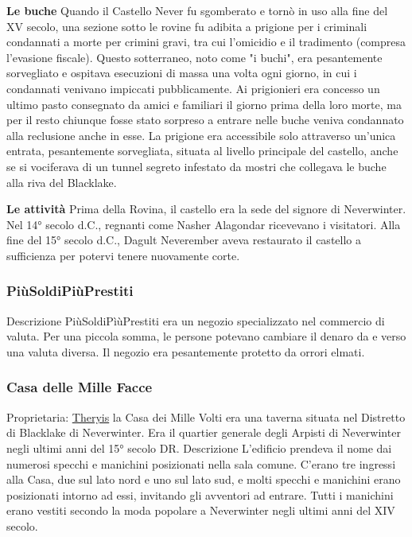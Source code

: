 \documentclass{article}
\begin{document}
\textbf{Le buche}
Quando il Castello Never fu sgomberato e tornò in uso alla fine del XV secolo, una sezione sotto le rovine fu adibita a prigione per i criminali condannati a morte per crimini gravi, tra cui l'omicidio e il tradimento (compresa l'evasione fiscale). Questo sotterraneo, noto come "i buchi", era pesantemente sorvegliato e ospitava esecuzioni di massa una volta ogni giorno, in cui i condannati venivano impiccati pubblicamente. Ai prigionieri era concesso un ultimo pasto consegnato da amici e familiari il giorno prima della loro morte, ma per il resto chiunque fosse stato sorpreso a entrare nelle buche veniva condannato alla reclusione anche in esse. La prigione era accessibile solo attraverso un'unica entrata, pesantemente sorvegliata, situata al livello principale del castello, anche se si vociferava di un tunnel segreto infestato da mostri che collegava le buche alla riva del Blacklake.


\textbf{Le attività}
Prima della Rovina, il castello era la sede del signore di Neverwinter. Nel 14° secolo d.C., regnanti come Nasher Alagondar ricevevano i visitatori. Alla fine del 15° secolo d.C., Dagult Neverember aveva restaurato il castello a sufficienza per potervi tenere nuovamente corte.

\subsubsection{PiùSoldiPiùPrestiti}
Descrizione
PiùSoldiPìùPrestiti era un negozio specializzato nel commercio di valuta. Per una piccola somma, le persone potevano cambiare il denaro da e verso una valuta diversa. Il negozio era pesantemente protetto da orrori elmati.


\subsubsection{Casa delle Mille Facce}
Proprietaria: \hyperlink{ther}{Theryis} \newline
la Casa dei Mille Volti era una taverna situata nel Distretto di Blacklake di Neverwinter. Era il quartier generale degli Arpisti di Neverwinter negli ultimi anni del 15° secolo DR.
Descrizione
L'edificio prendeva il nome dai numerosi specchi e manichini posizionati nella sala comune. C'erano tre ingressi alla Casa, due sul lato nord e uno sul lato sud, e molti specchi e manichini erano posizionati intorno ad essi, invitando gli avventori ad entrare. Tutti i manichini erano vestiti secondo la moda popolare a Neverwinter negli ultimi anni del XIV secolo.
\end{document}
